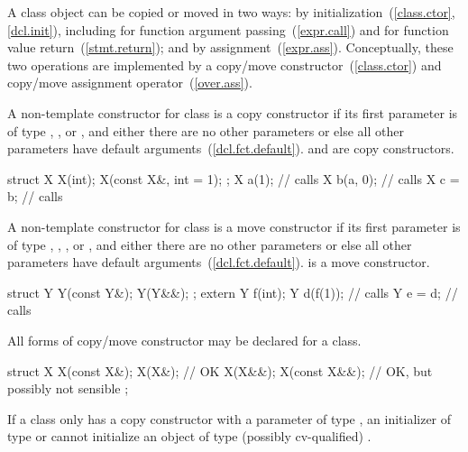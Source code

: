 \pnum
A class object can be copied or moved in two ways:
by initialization~(\ref{class.ctor}, \ref{dcl.init}), including for function argument passing~(\ref{expr.call}) and for function value return~(\ref{stmt.return});
and by assignment~(\ref{expr.ass}).
Conceptually, these two operations are implemented by a
copy/move constructor~(\ref{class.ctor})
and copy/move assignment operator~(\ref{over.ass}).

\pnum
{}%
%
A non-template constructor for class
is
a
copy
constructor if its first parameter is of type
,
,
or
,
and either there are no other parameters
or else all other parameters have default arguments~(\ref{dcl.fct.default}).
\enterexample
{}
and
are copy constructors.

\begin{codeblock}
struct X {
  X(int);
  X(const X&, int = 1);
};
X a(1);             // calls 
X b(a, 0);          // calls 
X c = b;            // calls 
\end{codeblock}
\exitexample

\pnum
A non-template constructor for class  is a move constructor if its
first parameter is of type , ,
, or , and either there are
no other parameters or else all other parameters have default 
arguments~(\ref{dcl.fct.default}).
\enterexample {} is a move constructor.
\begin{codeblock}
struct Y {
  Y(const Y&);
  Y(Y&&);
};
extern Y f(int);
Y d(f(1));          // calls 
Y e = d;            // calls 
\end{codeblock}
\exitexample

\pnum
\enternote
All forms of copy/move constructor may be declared for a class.
\enterexample

\begin{codeblock}
struct X {
  X(const X&);
  X(X&);            // OK
  X(X&&);
  X(const X&&);     // OK, but possibly not sensible
};
\end{codeblock}
\exitexample
\exitnote

\pnum
\enternote
If a class
only has a copy constructor with a parameter of type
,
an initializer of type
or
cannot initialize an object of type
(possibly
cv-qualified)
.
\enterexample

